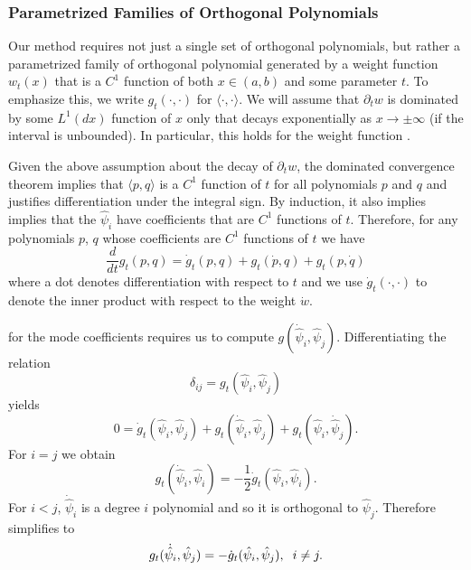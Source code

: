 \subsubsection{Parametrized Families of Orthogonal Polynomials}\label{ortho-polynom-fam}
Our method requires not just a single set of orthogonal polynomials, but rather a parametrized family of orthogonal polynomial generated by a weight function $w_t(x)$ that is a $C^1$ function of both $x\in(a,b)$ and some parameter $t$.  To emphasize this, we write $g_t(\cdot,\cdot)$ for $\langle\cdot,\cdot\rangle$.  We will assume that $\partial_t w$ is dominated by some $L^1(dx)$ function of $x$ only that decays exponentially as $x\rightarrow\pm\infty$ (if the interval is unbounded). In particular, this holds for the weight function .

Given the above assumption about the decay of $\partial_t w$, the dominated convergence theorem implies that $\langle p,q\rangle$ is a $C^1$ function of $t$ for all polynomials $p$ and $q$ and justifies  differentiation under the integral sign. By induction, it also implies implies that the $\hat\psi_i$ have coefficients that are $C^1$ functions of $t$. Therefore, for any polynomials $p$, $q$ whose coefficients are $C^1$ functions of $t$ we have
\begin{equation}
\frac{d}{dt}g_t( p,q)=\dot{g}_t(p,q)+g_t(\dot{p},q)+g_t( p,\dot{q})
\end{equation}
where a dot denotes differentiation with respect to $t$ and we use $\dot{g}_t(\cdot,\cdot)$ to denote the inner product with respect to the weight $\dot{w}$.  

 for the mode coefficients requires us to compute $g(\dot{\hat\psi}_i,\hat\psi_j)$.  Differentiating the relation
\begin{equation}
\delta_{ij}=g_t(\hat\psi_i,\hat\psi_j)
\end{equation}
yields
\begin{equation}\label{ortho_deriv_eq}
0=\dot g_t(\hat\psi_i,\hat\psi_j)+g_t(\dot{\hat\psi}_i,\hat\psi_j)+g_t(\hat\psi_i,\dot{\hat\psi}_j).
\end{equation}
For $i=j$ we obtain
\begin{equation}\label{norm_deriv_eq}
g_t(\dot{\hat\psi}_i,\hat\psi_i)=-\frac{1}{2}\dot{g}_t(\hat\psi_i,\hat\psi_i).
\end{equation}
For $i<j$, $\dot{\hat\psi}_i$ is a degree $i$ polynomial and so it is orthogonal to $\hat\psi_j$. Therefore  simplifies to
\begin{equation}
g_t(\dot{\hat\psi}_i,\hat\psi_j)=-\dot{g}_t(\hat\psi_i,\hat\psi_j),\hspace{2mm} i\neq j.
\end{equation}

